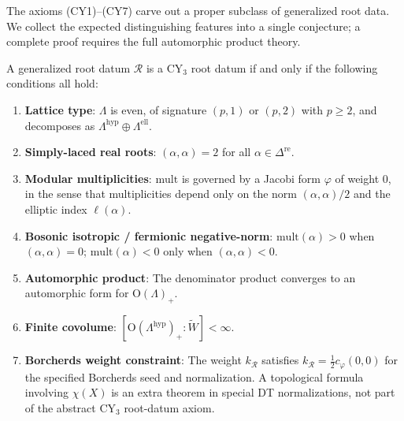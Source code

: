 The axioms (CY1)--(CY7) carve out a proper subclass of generalized root data. We collect the expected distinguishing features into a single conjecture; a complete proof requires the full automorphic product theory.

\begin{conjecture}
\label{conj:cy-characterization}

A generalized root datum $\mathcal{R}$ is a CY$_3$ root datum if and only if the following conditions all hold:
\begin{enumerate}[label=(\arabic*)]
 \item \textbf{Lattice type}: $\Lambda$ is even, of signature $(p,1)$ or $(p,2)$ with $p \geq 2$, and decomposes as $\Lambda^{\mathrm{hyp}} \oplus \Lambda^{\mathrm{ell}}$.

 \item \textbf{Simply-laced real roots}: $(\alpha, \alpha) = 2$ for all $\alpha \in \Delta^{\mathrm{re}}$.

 \item \textbf{Modular multiplicities}: $\mathrm{mult}$ is governed by a Jacobi form $\varphi$ of weight $0$, in the sense that multiplicities depend only on the norm $(\alpha, \alpha)/2$ and the elliptic index $\ell(\alpha)$.

 \item \textbf{Bosonic isotropic / fermionic negative-norm}: $\mathrm{mult}(\alpha) > 0$ when $(\alpha, \alpha) = 0$; $\mathrm{mult}(\alpha) < 0$ only when $(\alpha, \alpha) < 0$.

 \item \textbf{Automorphic product}: The denominator product converges to an automorphic form for $\mathrm{O}(\Lambda)_+$.

 \item \textbf{Finite covolume}: $[\mathrm{O}(\Lambda^{\mathrm{hyp}})_+ : \widetilde{W}] < \infty$.

 \item \textbf{Borcherds weight constraint}: The weight
 $k_\mathcal{R}$ satisfies $k_\mathcal{R} = \frac{1}{2}c_\varphi(0,0)$
 for the specified Borcherds seed and normalization. A topological
 formula involving $\chi(X)$ is an extra theorem in special DT
 normalizations, not part of the abstract CY$_3$ root-datum axiom.
\end{enumerate}
\end{conjecture}

